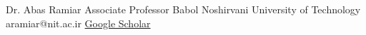 %
%
%


\begin{referees}
		{Dr. Abas Ramiar}
		{Associate Professor}
		{Babol Noshirvani University of Technology}
		{aramiar@nit.ac.ir}
		{\href{https://scholar.google.com/citations?hl=en\&user=ew-WXvQAAAAJ}{Google Scholar}}
\end{referees}
